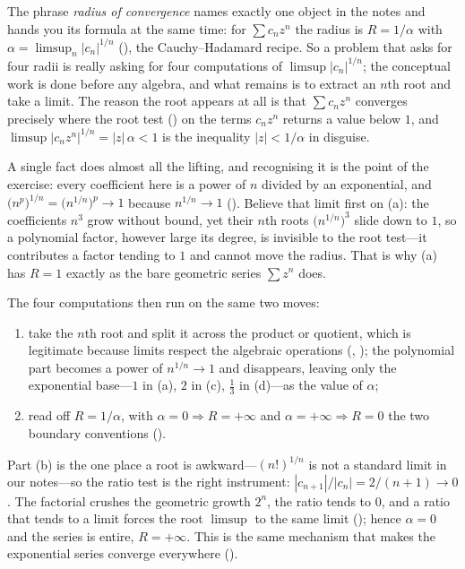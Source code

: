 \documentclass[main.tex]{subfiles}
\begin{document}
\begin{Reflection}
The phrase \emph{radius of convergence} names exactly one object in the notes and hands you its formula
at the same time: for $\sum c_n z^n$ the radius is $R=1/\alpha$ with
$\alpha=\limsup_n|c_n|^{1/n}$ (), the Cauchy--Hadamard recipe. So a problem that asks for
four radii is really asking for four computations of $\limsup|c_n|^{1/n}$; the conceptual work is done
before any algebra, and what remains is to extract an $n$th root and take a limit. The reason the root
appears at all is that $\sum c_n z^n$ converges precisely where the root test () on the
terms $c_n z^n$ returns a value below $1$, and $\limsup|c_n z^n|^{1/n}=|z|\,\alpha<1$ is the inequality
$|z|<1/\alpha$ in disguise.

A single fact does almost all the lifting, and recognising it is the point of the exercise: every
coefficient here is a power of $n$ divided by an exponential, and $\bigl(n^{p}\bigr)^{1/n}=\bigl(n^{1/n}\bigr)^{p}\to 1$
because $n^{1/n}\to 1$ (). Believe that limit first on (a): the coefficients $n^3$ grow
without bound, yet their $n$th roots $\bigl(n^{1/n}\bigr)^3$ slide down to $1$, so a polynomial factor,
however large its degree, is invisible to the root test---it contributes a factor tending to $1$ and
cannot move the radius. That is why (a) has $R=1$ exactly as the bare geometric series $\sum z^n$ does.

The four computations then run on the same two moves:
\begin{enumerate}[leftmargin=1.7em,itemsep=3pt,topsep=2pt,label=\textnormal{(\arabic*)}]
  \item take the $n$th root and split it across the product or quotient, which is legitimate because
        limits respect the algebraic operations (,
        ); the polynomial part becomes a power of $n^{1/n}\to 1$ and disappears, leaving
        only the exponential base---$1$ in (a), $2$ in (c), $\tfrac13$ in (d)---as the value of
        $\alpha$;
  \item read off $R=1/\alpha$, with $\alpha=0\Rightarrow R=+\infty$ and $\alpha=+\infty\Rightarrow R=0$
        the two boundary conventions ().
\end{enumerate}
Part (b) is the one place a root is awkward---$(n!)^{1/n}$ is not a standard limit in our notes---so the
ratio test is the right instrument: $|c_{n+1}|/|c_n|=2/(n+1)\to 0$. The factorial crushes the
geometric growth $2^n$, the ratio tends to $0$, and a ratio that tends to a limit forces the root
$\limsup$ to the same limit (); hence $\alpha=0$ and the series is entire, $R=+\infty$.
This is the same mechanism that makes the exponential series converge everywhere ().


\end{Reflection}
\end{document}
